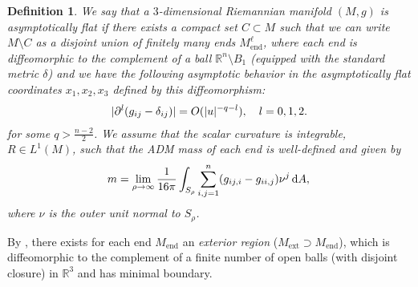 \documentclass[draft]{amsart}
\newtheorem{definition}[theorem]{Definition}
\newcommand*{\mathcomma}{,}
\newcommand*{\mathfullstop}{.}
\newcommand*{\goesto}{\to}
\newcommand*{\reals}{\mathbb{R}}
\DeclareMathOperator{\trace}{tr}
\DeclarePairedDelimiter{\abs}{\lvert}{\rvert} %
\newcommand{\ext}{\mathrm{ext}} %
\newcommand{\Mend}{M_{\mathrm{end}}} %
\begin{document}
\begin{definition}
    We say that a \( 3 \)-dimensional 
    Riemannian manifold \( (M,g) \) 
    is asymptotically flat if there exists a compact set \( C \subset M \) such that we can write \( M\setminus C \) as a disjoint union of finitely many \emph{ends} \( M_{\mathrm{end}}^\ell \), where each end is diffeomorphic to the complement of a ball \( \reals^n\setminus B_1 \) (equipped with the standard metric \( \delta \)) and we have the following asymptotic behavior in the \emph{asymptotically flat coordinates} \( x_1,x_2,x_3\) defined by this diffeomorphism:
    \begin{equation}
        \begin{aligned}[t]
            \abs{\partial^l(g_{ij}-\delta_{ij})}&=O(\abs{u}^{-q-l}),\quad l=0,1,2\mathfullstop\\
        \end{aligned}
    \end{equation}
    for some \( q>\frac{n-2}{2} \). We assume that the scalar curvature is integrable, \( R \in L^1(M) \), such that the ADM mass of each end is well-defined and given by
    \begin{equation*}
        m=\lim_{\rho\goesto \infty} 
        \frac{1}{16\pi}
        \int_{S_\rho}\sum_{i,j=1}^{n}(g_{ij,i}-g_{ii,j})\nu^j 
        \odif{A}
        \mathcomma\\
    \end{equation*}
    where \( \nu \) is the outer unit normal to \( S_\rho \).
\end{definition}
By \cite[Lemma 4.1]{huiskenInverseMeanCurvature2001}, there exists for each end \( \Mend \) an \emph{exterior region} (\( M_\ext \supset \Mend \)), which is diffeomorphic to the complement of a finite number of open balls (with disjoint closure) in \( \reals^3 \) and has minimal boundary.
\end{document}
